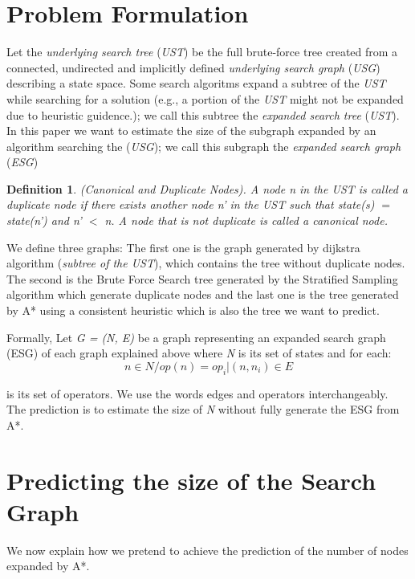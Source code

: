 \documentclass[11pt,a4paper,oneside]{report}
\newtheorem{mydef}{Definition}
\begin{document}
\section{Problem Formulation}
Let the \textit{underlying search tree} (\textit{UST}) be the full brute-force tree created from a connected, undirected and implicitly defined \textit{underlying search graph} (\textit{USG}) describing a state space. Some search algoritms expand a subtree of the \textit{UST} while searching for a solution (e.g., a portion of the \textit{UST} might not be expanded due to heuristic guidence.); we call this subtree the \textit{expanded search tree} (\textit{UST}). In this paper we want to estimate the size of the subgraph expanded by an algorithm searching the (\textit{USG}); we call this subgraph the \textit{expanded search graph} (\textit{ESG})

\begin{mydef}
\textit{(Canonical and Duplicate Nodes). A node n in the UST is called a duplicate node if there exists another node n' in the UST such that state(s) $=$ state(n') and n' $<$  n. A node that is not duplicate is called a canonical node.}
\end{mydef}

We define three graphs: The first one is the graph generated by dijkstra algorithm (\textit{subtree of the UST}), which contains the tree without duplicate nodes. The second is the Brute Force Search tree generated by the Stratified Sampling algorithm which generate duplicate nodes and the last one is the tree generated by A* using a consistent heuristic which is also the tree we want to predict.\newline

Formally, Let \textit{G = (N, E)} be a  graph representing an expanded search graph (ESG) of  each graph explained above where \textit{N} is its set of states and  for each:
\[  {n \in  N / op(n) =  {op_i|(n, n_i)}  \in E }  \]

 is its set of operators. We use the words edges and operators interchangeably. The prediction is to estimate the size of \textit{N} without fully generate the ESG from A*.

\section{Predicting the size of the Search Graph}
We now explain how we pretend to achieve the prediction of the number of  nodes expanded by A*.\newline
\end{document}
